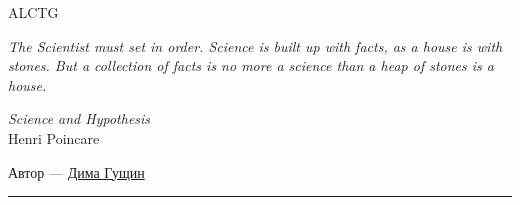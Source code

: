 	\begin{titlepage}
		\noindent
		\titlefont ALCTG \par
		\epigraph{\textit{The Scientist must set in order. 
		Science is built up with facts, as a house is with stones. 
		But a collection of facts is no more a science 
		than a heap of stones is a house.}}%
		{\textit{Science and Hypothesis}\\ Henri Poincare}
		\null\vfill
		\vspace*{1cm}
		\noindent
		\hfill
		\begin{minipage}{0.35\linewidth}
    		\begin{flushright}
        		 Автор --- 
    			\href{https://vk.com/gushchin_dima}{Дима Гущин}
    		\end{flushright}
		\end{minipage}
		\begin{minipage}{0.02\linewidth}
    		\rule{1pt}{50pt}
		\end{minipage}
	\end{titlepage}
	
	{
  		\hypersetup{hidelinks}
		\renewcommand\contentsname{Table of contents}
  		\tableofcontents
		\clearpage
	}